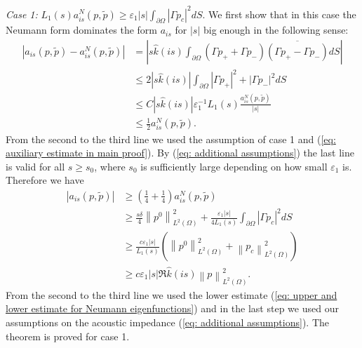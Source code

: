 \documentclass{amsart}
\newcommand{\abs}[1]{\left|#1\right|}
\newcommand{\norm}[1]{\left\| #1 \right\|}
\newcommand{\khat}{\hat{k}}
\newcommand{\ptilde}{\tilde{p}}
\begin{document}
\emph{Case 1: } $L_1(s)a^N_{is}(p,\ptilde)\geq \varepsilon_1 \abs{s}\int_{\partial\Omega}\abs{\Gamma p_c}^2 dS$. We first show that in this case the Neumann form dominates the form $a_{is}$ for $\abs{s}$ big enough in the following sense:
\begin{align*}
 \abs{a_{is}(p,\ptilde)-a^N_{is}(p,\ptilde)} &= \abs{s\khat(is)\int_{\partial\Omega}(\Gamma p_+ + \Gamma p_-)\overline{(\Gamma p_+ - \Gamma p_-)} dS}\\
 &\leq 2\abs{s\khat(is)} \int_{\partial\Omega} \abs{\Gamma p_+}^2 + \abs{\Gamma p_-}^2 dS \\
 &\leq C \abs{s\khat(is)} \varepsilon_1^{-1} L_1(s) \frac{a^N_{is}(p,\ptilde)}{\abs{s}} \\
 &\leq \frac{1}{2} a^N_{is}(p,\ptilde) .
\end{align*}
From the second to the third line we used the assumption of case 1 and (\ref{eq: auxiliary estimate in main proof}). By (\ref{eq: additional assumptions}) the last line is valid for all $s\geq s_0$, where $s_0$ is sufficiently large depending on how small $\varepsilon_1$ is. Therefore we have
\begin{align*}
 \abs{a_{is}(p,\ptilde)} &\geq (\frac{1}{4} + \frac{1}{4}) a^N_{is}(p,\ptilde) \\
 &\geq \frac{s\delta}{4}\norm{p^0}_{L^2(\Omega)}^2 + \frac{\varepsilon_1\abs{s}}{4L_1(s)}\int_{\partial\Omega}\abs{\Gamma p_c}^2 dS \\
 &\geq \frac{c\varepsilon_1 \abs{s}}{L_1(s)} \left(\norm{p^0}_{L^2(\Omega)}^2 + \norm{p_c}_{L^2(\Omega)}^2\right) \\
 &\geq c\varepsilon_1 \abs{s}\Re\khat(is)\norm{p}_{L^2(\Omega)}^2 .
\end{align*}
From the second to the third line we used the lower estimate (\ref{eq: upper and lower estimate for Neumann eigenfunctions}) and in the last step we used our assumptions on the acoustic impedance (\ref{eq: additional assumptions}). The theorem is proved for case 1.
\end{document}
